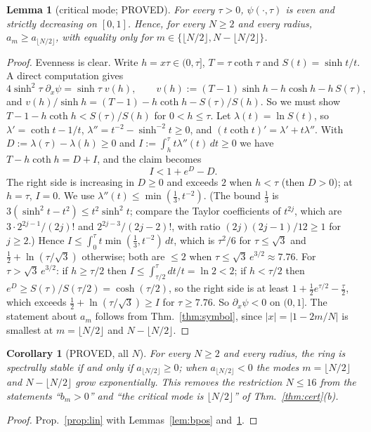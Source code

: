 \documentclass[11pt]{article}
\newtheorem{lemma}[theorem]{Lemma}
\newtheorem{corollary}[theorem]{Corollary}
\theoremstyle{remark}
\begin{document}
\begin{lemma}[critical mode; PROVED]\label{lem:crit}
For every $\tau>0$, $\psi(\cdot,\tau)$ is even and strictly decreasing on $[0,1]$. Hence, for every $N\ge2$ and every radius,
$a_m\ge a_{\lfloor N/2\rfloor}$, with equality only for $m\in\{\lfloor N/2\rfloor,N-\lfloor N/2\rfloor\}$.
\end{lemma}
\begin{proof}
Evenness is clear. Write $h=x\tau\in(0,\tau]$, $T=\tau\coth\tau$ and $S(t)=\sinh t/t$. A direct computation gives
\[
4\sinh^2\tau\;\partial_x\psi=\sinh\tau\;v(h),\qquad v(h):=(T-1)\sinh h-h\cosh h-h\,S(\tau),
\]
and $v(h)/\sinh h=(T-1)-h\coth h-S(\tau)/S(h)$. So we must show $T-1-h\coth h<S(\tau)/S(h)$ for $0<h\le\tau$. Let
$\lambda(t)=\ln S(t)$, so $\lambda'=\coth t-1/t$, $\lambda''=t^{-2}-\sinh^{-2}t\ge0$, and $(t\coth t)'=\lambda'+t\lambda''$.
With $D:=\lambda(\tau)-\lambda(h)\ge0$ and $I:=\int_h^\tau t\lambda''(t)\,dt\ge0$ we have $T-h\coth h=D+I$, and the claim
becomes
\[
I<1+e^D-D .
\]
The right side is increasing in $D\ge0$ and exceeds $2$ when $h<\tau$ (then $D>0$); at $h=\tau$, $I=0$. We use
$\lambda''(t)\le\min(\frac13,t^{-2})$. (The bound $\frac13$ is $3(\sinh^2t-t^2)\le t^2\sinh^2t$; compare the Taylor
coefficients of $t^{2j}$, which are $3\cdot2^{2j-1}/(2j)!$ and $2^{2j-3}/(2j-2)!$, with ratio $(2j)(2j-1)/12\ge1$ for $j\ge2$.)
Hence $I\le\int_0^\tau t\min(\frac13,t^{-2})\,dt$, which is $\tau^2/6$ for $\tau\le\sqrt3$ and $\frac12+\ln(\tau/\sqrt3)$
otherwise; both are $\le2$ when $\tau\le\sqrt3\,e^{3/2}\approx7.76$. For $\tau>\sqrt3\,e^{3/2}$: if $h\ge\tau/2$ then
$I\le\int_{\tau/2}^\tau dt/t=\ln2<2$; if $h<\tau/2$ then $e^D\ge S(\tau)/S(\tau/2)=\cosh(\tau/2)$, so the right side is at least
$1+\frac12e^{\tau/2}-\frac\tau2$, which exceeds $\frac12+\ln(\tau/\sqrt3)\ge I$ for $\tau\ge7.76$. So $\partial_x\psi<0$ on $(0,1]$.
The statement about $a_m$ follows from Thm.~\ref{thm:symbol}, since $|x|=|1-2m/N|$ is smallest at $m=\lfloor N/2\rfloor$ and
$N-\lfloor N/2\rfloor$.
\end{proof}

\begin{corollary}[PROVED, all $N$]\label{cor:alln}
For every $N\ge2$ and every radius, the ring is spectrally stable if and only if $a_{\lfloor N/2\rfloor}\ge0$; when
$a_{\lfloor N/2\rfloor}<0$ the modes $m=\lfloor N/2\rfloor$ and $N-\lfloor N/2\rfloor$ grow exponentially. This removes the
restriction $N\le16$ from the statements ``$b_m>0$'' and ``the critical mode is $\lfloor N/2\rfloor$'' of
Thm.~\ref{thm:cert}(b).
\end{corollary}
\begin{proof}
Prop.~\ref{prop:lin} with Lemmas~\ref{lem:bpos} and~\ref{lem:crit}.
\end{proof}
\end{document}
